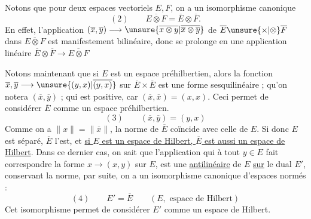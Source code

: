 Notons que pour deux espaces vectoriels $E,F$, on a un isomorphisme canonique
\[
(2)\qquad\overline{E\otimes F}=\overline E\otimes\overline F.
\]
En effet, l'application $(\overline x,\overline y)\longrightarrow\unsure{\overline{x\otimes y}|\overline{\overline x\otimes\overline y}}$ de $\overline E\unsure{\times|\otimes}\overline F$ dans $\overline{E\otimes F}$ est manifestement bilinéaire, donc se prolonge en une application linéaire $\overline E\otimes\overline F\longrightarrow\overline{E\otimes F}$

Notons maintenant que si $E$ est un espace préhilbertien, alors la fonction $\overline x,\overline y\longrightarrow\unsure{(y,x)|\overline{(y,x)}}$ sur $\overline E\times\overline E$ est une forme sesquilinéaire ; qu'on notera $(\overline x,\overline y)$ ; qui   est   positive, car $(\overline x,\overline x)=(x,x)$.
Ceci permet de considérer $\overline E$ comme un espace préhilbertien.
\[
(3)\qquad(\overline x,\overline y)=(y,x)
\]
Comme on a $\|x\|=\|\overline x\|$, la norme de $\overline E$ coïncide avec celle de $E$. Si donc $E$ est séparé, $\overline E$ l'est, et \uline{si $E$ est un espace de Hilbert, $\overline E$ est aussi un espace de Hilbert}.
Dans ce dernier cas, on sait que l'application qui à tout $y\in E$ fait correspondre la forme $x\longrightarrow(x,y)$ sur $E$, est une   \uline{antilinéaire} de $E$ \uline{sur} le dual $E'$, conservant la norme, par suite, on a   un isomorphisme canonique d'espaces normés :
\[
(4)\qquad E'=\overline E\qquad(E,\text{ espace de Hilbert})
\]
Cet isomorphisme permet de considérer $E'$ comme   un espace de Hilbert.
